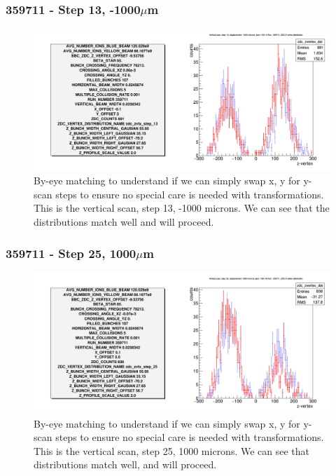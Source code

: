 \begin{frame}
  \frametitle{359711 - Step 13, -1000$\mu$m}
  \begin{center}
    \begin{figure}
      \includegraphics[width=\linewidth]{./figures/step_13_transf}
      \caption{
        By-eye matching to understand if we can simply swap x, y for y-scan
        steps to ensure no special care is needed with transformations. This is
        the vertical scan, step 13, -1000 microns. We can see that the
        distributions match well and will proceed.
      }
      \label{fig:step_12_transf}
    \end{figure}
  \end{center}
\end{frame}

\begin{frame}
  \frametitle{359711 - Step 25, 1000$\mu$m}
  \begin{center}
    \begin{figure}
      \includegraphics[width=\linewidth]{./figures/step_25_transf}
      \caption{
        By-eye matching to understand if we can simply swap x, y for y-scan
        steps to ensure no special care is needed with transformations. This is
        the vertical scan, step 25, 1000 microns. We can see that distributions
        match well, and will proceed.
      }
      \label{fig:step_12_transf}
    \end{figure}
  \end{center}
\end{frame}
